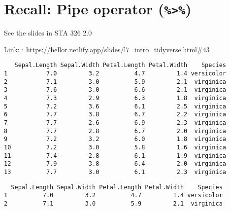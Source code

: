 \documentclass[]{article}
\newenvironment{Shaded}{\begin{snugshade}}{\end{snugshade}}
\newcommand{\DecValTok}[1]{\textcolor[rgb]{0.00,0.00,0.81}{#1}}
\newcommand{\KeywordTok}[1]{\textcolor[rgb]{0.13,0.29,0.53}{\textbf{#1}}}
\newcommand{\NormalTok}[1]{#1}
\newcommand{\OperatorTok}[1]{\textcolor[rgb]{0.81,0.36,0.00}{\textbf{#1}}}
\newcommand{\StringTok}[1]{\textcolor[rgb]{0.31,0.60,0.02}{#1}}
\begin{document}
\hypertarget{recall-pipe-operator}{%
\section{\texorpdfstring{Recall: Pipe operator
(\texttt{\%\textgreater{}\%})}{Recall: Pipe operator (\%\textgreater{}\%)}}\label{recall-pipe-operator}}

See the slides in STA 326 2.0

Link: :
\url{https://hellor.netlify.app/slides/l7_intro_tidyverse.html\#43}

\begin{Shaded}
\end{Shaded}

\begin{verbatim}
   Sepal.Length Sepal.Width Petal.Length Petal.Width    Species
1           7.0         3.2          4.7         1.4 versicolor
2           7.1         3.0          5.9         2.1  virginica
3           7.6         3.0          6.6         2.1  virginica
4           7.3         2.9          6.3         1.8  virginica
5           7.2         3.6          6.1         2.5  virginica
6           7.7         3.8          6.7         2.2  virginica
7           7.7         2.6          6.9         2.3  virginica
8           7.7         2.8          6.7         2.0  virginica
9           7.2         3.2          6.0         1.8  virginica
10          7.2         3.0          5.8         1.6  virginica
11          7.4         2.8          6.1         1.9  virginica
12          7.9         3.8          6.4         2.0  virginica
13          7.7         3.0          6.1         2.3  virginica
\end{verbatim}

\begin{Shaded}
\end{Shaded}

\begin{verbatim}
  Sepal.Length Sepal.Width Petal.Length Petal.Width    Species
1          7.0         3.2          4.7         1.4 versicolor
2          7.1         3.0          5.9         2.1  virginica
\end{verbatim}
\end{document}
